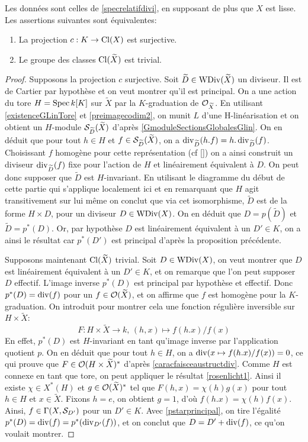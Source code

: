 \begin{thm}\label{clgtrivial}
Les données sont celles de \ref{specrelatifdivi}, en supposant de plus que $X$ est lisse. Les assertions suivantes sont équivalentes:
\begin{enumerate}
\item La projection $c:K\rightarrow \operatorname{Cl}(X)$ est surjective.
\item Le groupe des classes $\operatorname{Cl}(\widetilde{X})$ est trivial.
\end{enumerate}
\end{thm}
\begin{proof}
Supposons la projection $c$ surjective. Soit $\widetilde{D}\in \operatorname{WDiv}(\widetilde{X})$ un diviseur. Il est de Cartier par hypothèse et on veut montrer qu'il est principal. On a une action du tore $H=\operatorname{Spec} k[K]$ sur $\widetilde{X}$ par la $K$-graduation de $\mathcal{O}_{\widetilde{X}}$. En utilisant \ref{existenceGLinTore} et \ref{preimagecodim2}, on munit $L$ d'une H-linéarisation et on obtient un $H$-module $\mathcal{S}_{\widetilde{D}}(\widetilde{X})$ d'après \ref{GmoduleSectionsGlobalesGlin}. On en déduit que pour tout $h\in H$ et $f\in \mathcal{S}_{\widetilde{D}}(\widetilde{X})$, on a $\operatorname{div}_{\widetilde{D}}(h.f)=h.\operatorname{div}_{\widetilde{D}}(f)$. Choisissant $f$ homogène pour cette représentation (cf \ref{}) on a ainsi construit un diviseur $\operatorname{div}_{\widetilde{D}}(f)$ fixe pour l'action de $H$ et linéairement équivalent à $D$. On peut donc supposer que $\widetilde{D}$ est $H$-invariant. En utilisant le diagramme du début de cette partie qui s'applique localement ici et en remarquant que $H$ agit transitivement sur lui même on conclut que via cet isomorphisme, $\widetilde{D}$ est de la forme $H\times D$, pour un diviseur $D\in \operatorname{WDiv}(X)$. On en déduit que $D=p(\widetilde{D})$ et $\widetilde{D}=p^*(D)$. Or, par hypothèse $D$ est linéairement équivalent à un $D'\in K$, on a ainsi le résultat car $p^*(D')$ est principal d'après la proposition précédente.

Supposons maintenant $\operatorname{Cl}(\widetilde{X})$ trivial. Soit $D\in\operatorname{WDiv}(X)$, on veut montrer que $D$ est linéairement équivalent à un $D'\in K$, et on remarque que l'on peut supposer $D$ effectif. L'image inverse $p^*(D)$ est principal par hypothèse et effectif. Donc $p^*(D)=\operatorname{div}(f)$ pour un $f\in \mathcal{O}(\widetilde{X})$, et on affirme que $f$ est homogène pour la $K$-graduation. On introduit pour montrer cela une fonction régulière inversible sur $H\times \widetilde{X}$:
$$F:H\times \widetilde{X}\rightarrow k,\,(h,x)\mapsto f(h.x)/f(x)$$
En effet, $p^*(D)$ est $H$-invariant en tant qu'image inverse par l'application quotient $p$. On en déduit que pour tout $h\in H$, on a $\operatorname{div}(x\mapsto f(h.x)/f(x))=0$, ce qui prouve que $F\in \mathcal{O}(H\times \widetilde{X})^*$ d'après \ref{caracfaisceaustructdiv}. Comme $H$ est connexe en tant que tore, on peut appliquer le résultat \ref{rosenlicht1}. Ainsi il existe $\chi \in X^*(H)$ et $g\in\mathcal{O}(\widetilde{X})^*$ tel que $F(h,x)=\chi(h)g(x)$ pour tout $h\in H$ et $x\in \widetilde{X}$. Fixons $h=e$, on obtient $g=1$, d'où $f(h.x)=\chi(h)f(x)$. Ainsi, $f\in \Gamma(X, \mathcal{S}_{D'})$ pour un $D'\in K$. Avec \ref{pstarprincipal}, on tire l'égalité $p^*(D)=\operatorname{div}(f)=p^*(\operatorname{div}_{D'}(f))$, et on conclut que $D=D'+\operatorname{div}(f)$, ce qu'on voulait montrer.


\end{proof}
